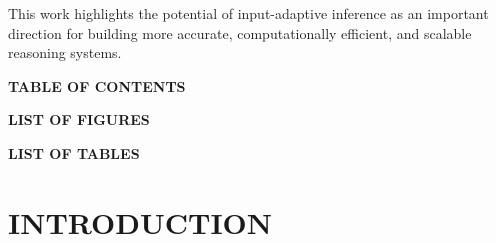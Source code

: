 \documentclass[12pt,a4paper,titlepage]{report}
\begin{document}
This work highlights the potential of input-adaptive inference as an important direction for building more accurate, computationally efficient, and scalable reasoning systems.

\clearpage

\clearpage
\begin{center}
    {\Large\bfseries TABLE OF CONTENTS\par}
\end{center}
\renewcommand{\contentsname}{}
\vspace{-0.5in}
\tableofcontents

\clearpage

\renewcommand{\listfigurename}{}
\begin{center}
    {\Large\bfseries LIST OF FIGURES\par}
\end{center}
\vspace{-0.3in}
\listoffigures
{}

\clearpage
\pagestyle{maincontent}

\renewcommand{\listtablename}{}
\begin{center}
    {\Large\bfseries LIST OF TABLES\par}
\end{center}
\vspace{-0.3in}
\listoftables
{}

\clearpage


\pagestyle{maincontent}


\chapter{INTRODUCTION}
\end{document}
